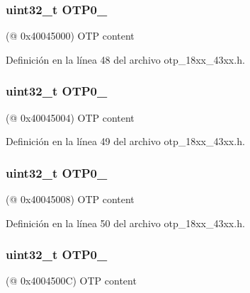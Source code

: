 \subsubsection[{\texorpdfstring{O\+T\+P0\+\_\+0}{OTP0_0}}]{ uint32\+\_\+t O\+T\+P0\+\_}\hypertarget{struct_l_p_c___o_t_p___t_aafa6e995289fe125b20424c76021729e}{}\label{struct_l_p_c___o_t_p___t_aafa6e995289fe125b20424c76021729e}
(@ 0x40045000) O\+TP content 

Definición en la línea 48 del archivo otp\+\_\+18xx\+\_\+43xx.\+h.

\subsubsection[{\texorpdfstring{O\+T\+P0\+\_\+1}{OTP0_1}}]{ uint32\+\_\+t O\+T\+P0\+\_}\hypertarget{struct_l_p_c___o_t_p___t_ad36305afed6bd8e8bdea47a45699fb7c}{}\label{struct_l_p_c___o_t_p___t_ad36305afed6bd8e8bdea47a45699fb7c}
(@ 0x40045004) O\+TP content 

Definición en la línea 49 del archivo otp\+\_\+18xx\+\_\+43xx.\+h.

\subsubsection[{\texorpdfstring{O\+T\+P0\+\_\+2}{OTP0_2}}]{ uint32\+\_\+t O\+T\+P0\+\_}\hypertarget{struct_l_p_c___o_t_p___t_ac7fc5a04bb8766845ffdab36a3ef2152}{}\label{struct_l_p_c___o_t_p___t_ac7fc5a04bb8766845ffdab36a3ef2152}
(@ 0x40045008) O\+TP content 

Definición en la línea 50 del archivo otp\+\_\+18xx\+\_\+43xx.\+h.

\subsubsection[{\texorpdfstring{O\+T\+P0\+\_\+3}{OTP0_3}}]{ uint32\+\_\+t O\+T\+P0\+\_}\hypertarget{struct_l_p_c___o_t_p___t_aed395d3b6adea1f7a85a2ccf2d0b87e7}{}\label{struct_l_p_c___o_t_p___t_aed395d3b6adea1f7a85a2ccf2d0b87e7}
(@ 0x4004500C) O\+TP content 

